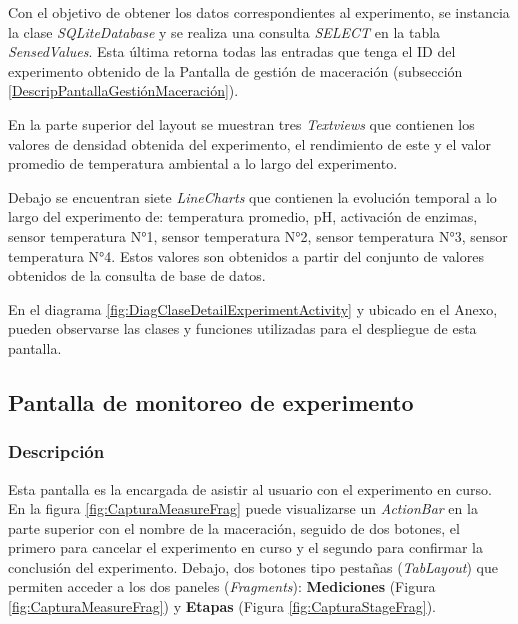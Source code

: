             \par Con el objetivo de obtener los datos correspondientes al experimento, se instancia la clase \textit{SQLiteDatabase} y se realiza una consulta \textit{SELECT} en la tabla \textit{SensedValues}. Esta última retorna todas las entradas que tenga el ID del experimento obtenido de la Pantalla de gestión de maceración (subsección \ref{DescripPantallaGestiónMaceración}).
            
            \par En la parte superior del layout se muestran tres \textit{Textviews} que contienen los valores de densidad obtenida del experimento, el rendimiento de este y el valor promedio de temperatura ambiental a lo largo del experimento. 
            
            \par Debajo se encuentran siete \textit{LineCharts} que contienen la evolución temporal a lo largo del experimento de: temperatura promedio, pH, activación de enzimas, sensor temperatura N°1, sensor temperatura N°2, sensor temperatura N°3, sensor temperatura N°4. Estos valores son obtenidos a partir del conjunto de valores obtenidos de la consulta de base de datos.
            
            \par En el diagrama \ref{fig:DiagClaseDetailExperimentActivity} y ubicado en el Anexo, pueden observarse las clases y funciones utilizadas para el despliegue de esta pantalla.
        
        \subsection{Pantalla de monitoreo de experimento}
        \label{DescripPantallaMonitoreoExperimento}
            \subsubsection{Descripción}
            Esta pantalla es la encargada de asistir al usuario con el experimento en curso.
            En la figura \ref{fig:CapturaMeasureFrag} puede visualizarse un \textit{ActionBar} en la parte superior con el nombre de la maceración, seguido de dos botones, el primero para cancelar el experimento en curso y el segundo para confirmar la conclusión del experimento. Debajo, dos botones tipo pestañas (\textit{TabLayout}) que permiten acceder a los dos paneles (\textit{Fragments}): \textbf{Mediciones} (Figura \ref{fig:CapturaMeasureFrag}) y \textbf{Etapas} (Figura \ref{fig:CapturaStageFrag}).
            
